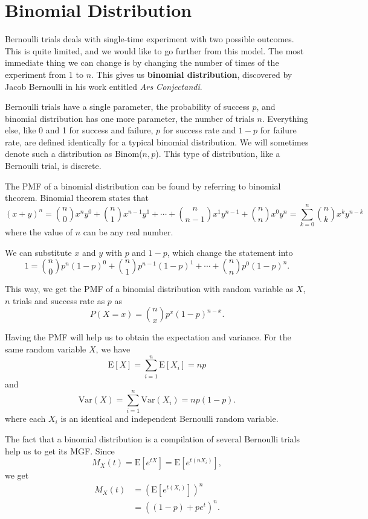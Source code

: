 \documentclass[11pt, a4paper, oneside]{book}
\theoremstyle{definition}
\newcommand{\var}[1]{\text{Var}(#1)}
\newcommand{\E}[1]{\text{E}[#1]}
\begin{document}
\section{Binomial Distribution}

\noindent Bernoulli trials deals with single-time experiment with two possible outcomes. This is quite limited, and we would like to go further from this model. The most immediate thing we can change is by changing the number of times of the experiment from 1 to $n$. This gives us \textbf{binomial distribution}, discovered by Jacob Bernoulli in his work entitled \emph{Ars Conjectandi}. 

\noindent Bernoulli trials have a single parameter, the probability of success $p$, and binomial distribution has one more parameter, the number of trials $n$. Everything else, like 0 and 1 for success and failure, $p$ for success rate and $1-p$ for failure rate, are defined identically for a typical binomial distribution. We will sometimes denote such a distribution as Binom($n,p$). This type of distribution, like a Bernoulli trial, is discrete.  

\noindent The PMF of a binomial distribution can be found by referring to binomial theorem. Binomial theorem states that \[
(x+y)^n = {n \choose 0}x^n y^0 + {n \choose 1}x^{n-1} y^1 + \cdots + {n \choose n-1}x^1 y^{n-1} + {n \choose n}x^{0} y^n = \sum^n_{k=0}{n \choose k}x^{k}y^{n-k}
\]
where the value of $n$ can be any real number.

\noindent We can substitute $x$ and $y$ with $p$ and $1-p$, which change the statement into\[
1 =  {n \choose 0}p^n (1-p)^0 + {n \choose 1}p^{n-1} (1-p)^1 + \cdots + {n \choose n}p^{0} (1-p)^n.
\]

\noindent This way, we get the PMF of a binomial distribution with random variable as $X$, $n$ trials and success rate as $p$ as\[
P(X=x) = \binom nx p^x(1-p)^{n-x}.
\]

\noindent Having the PMF will help us to obtain the expectation and variance. For the same random variable $X$, we have\[
\E{X} = \sum_{i=1}^n \E{X_i} = np
\]
and \[
\var{X} = \sum_{i=1}^n \var{X_i} = np(1-p). 
\]
where each $X_i$ is an identical and independent Bernoulli random variable.

\noindent The fact that a binomial distribution is a compilation of several Bernoulli trials help us to get its MGF. Since \[
M_X(t) = \E{e^{tX}} =\E{e^{t(nX_i)}} ,
\]
we get
\begin{equation*}
\begin{split}
M_X(t) &= (\E{e^{t(X_i)}})^n \\
&= ((1-p) + pe^t)^n. \\
\end{split}
\end{equation*}
\end{document}
